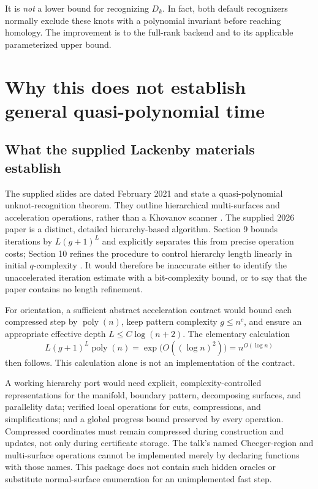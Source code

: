 \documentclass[11pt,letterpaper]{article}
\theoremstyle{definition}
\newcommand{\poly}{\operatorname{poly}}
\begin{document}
It is \emph{not} a lower bound for recognizing $D_k$. In fact, both default
recognizers normally exclude these knots with a polynomial invariant before
reaching homology. The improvement is to the full-rank backend and to its
applicable parameterized upper bound.

\section[Quasi-polynomial target]{Why this does not establish general quasi-polynomial time}

\subsection{What the supplied Lackenby materials establish}

The supplied slides are dated February 2021 and state a quasi-polynomial
unknot-recognition theorem. They outline hierarchical multi-surfaces and
acceleration operations, rather than a Khovanov scanner \cite{lackenbytalk}.
The supplied 2026 paper is a distinct, detailed hierarchy-based algorithm.
Section 9 bounds iterations by $L(g+1)^L$ and explicitly separates this from
precise operation costs; Section 10 refines the procedure to control hierarchy
length linearly in initial $q$-complexity \cite{lackenby2026}. It would therefore
be inaccurate either to identify the unaccelerated iteration estimate with a
bit-complexity bound, or to say that the paper contains no length refinement.

For orientation, a sufficient abstract acceleration contract would bound each
compressed step by $\poly(n)$, keep pattern complexity $g\leq n^c$, and ensure
an appropriate effective depth $L\leq C\log(n+2)$. The elementary calculation
\[
 L(g+1)^L\poly(n)
 =\exp\!\bigl(O((\log n)^2)\bigr)
 =n^{O(\log n)}
\]
then follows. This calculation alone is not an implementation of the contract.

A working hierarchy port would need explicit, complexity-controlled
representations for the manifold, boundary pattern, decomposing surfaces, and
parallelity data; verified local operations for cuts, compressions, and
simplifications; and a global progress bound preserved by every operation.
Compressed coordinates must remain compressed during construction and updates,
not only during certificate storage. The talk's named Cheeger-region and
multi-surface operations cannot be implemented merely by declaring functions
with those names. This package does not contain such hidden oracles or substitute
normal-surface enumeration for an unimplemented fast step.
\end{document}
